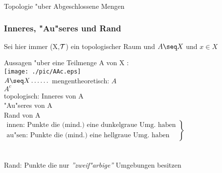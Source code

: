 \begin{satz}\label{2.26}{\sc Topologie "uber Abgeschlossene Mengen}
\end{satz}

\subsubsection{Inneres, "Au"seres und Rand}

Sei hier immer (X,$\mathcal T$) ein topologischer Raum und $A\seq X$ und $x\in X$

Aussagen "uber eine Teilmenge A von X :\\
\hspace*{10cm}\texttt{[image: ./pic/AAc.eps]}\vspace*{-2.7cm}\\
$A\seq X\dots\dots$ mengentheoretisch: $A$\\
\hspace*{6cm} $A^c$\\
\hspace*{2.6cm}topologisch: Inneres von A\\
\hspace*{4.85cm}"Au"seres von A\\
\hspace*{4.85cm}Rand von A\vspace*{0.1cm}\\
\hspace*{-0.2cm}$\left.\begin{array}{l}
\mbox{innen: Punkte die (mind.) eine dunkelgraue Umg. haben}\\
\mbox{au"sen: Punkte die (mind.) eine hellgraue Umg. haben}
\end{array}\right\}$\vspace*{-0.8cm}\\
\vspace*{-0.2cm}\\
\hspace*{11cm}{\scriptsize Umgebung haben}\vspace*{0.15cm}\\
Rand: Punkte die nur {\it ''zweif"arbige''} Umgebungen besitzen

